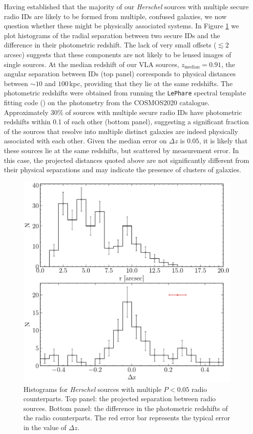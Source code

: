 Having established that the majority of our \textit{Herschel} sources with multiple secure radio IDs are likely to be formed from multiple, confused galaxies, we now question whether these might be physically associated systems. In Figure \ref{fig:multiples_separation} we plot histograms of the radial separation between two secure IDs and the difference in their photometric redshift. The lack of very small offsets ($\lesssim 2\,$arcsec) suggests that these components are not likely to be lensed images of single sources. At the median redshift of our VLA sources, $z_\textrm{median} = 0.91$, the angular separation between IDs (top panel) corresponds to physical distances between $\sim 10$ and $100\,$kpc, providing that they lie at the same redshifts. The photometric redshifts were obtained from running the \texttt{LePhare} spectral template fitting code (\citealt{Arnouts_1999, Ilbert_2006}) on the photometry from the COSMOS2020 catalogue. Approximately $30\%$ of sources with multiple secure radio IDs have photometric redshifts within 0.1 of each other (bottom panel), suggesting a significant fraction of the sources that resolve into multiple distinct galaxies are indeed physically associated with each other. Given the median error on $\Delta z$ is $0.05$, it is likely that these sources lie at the same redshifts, but scattered by measurement error. In this case, the projected distances quoted above are not significantly different from their physical separations and may indicate the presence of clusters of galaxies.

\begin{figure}
	\centering
	\includegraphics[width=0.63\columnwidth]{Figures/Figure_5_7.pdf}
	\caption[Physical separation between radio IDs for a single \textit{Herschel} source]{Histograms for \textit{Herschel} sources with multiple $P < 0.05$ radio counterparts. Top panel: the projected separation between radio sources. Bottom panel: the difference in the photometric redshifts of the radio counterparts. The red error bar represents the typical error in the value of $\Delta z$.}	
	\label{fig:multiples_separation}
\end{figure}

